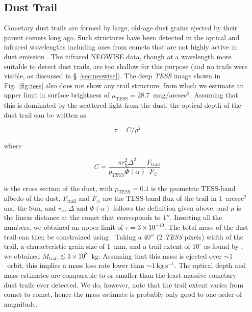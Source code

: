 \documentclass[modern]{aastex631}
\begin{document}
\begin{CJK*}{UTF8}{gbsn}
\subsection{Dust Trail}

Cometary dust trails are formed by large, old-age dust grains ejected by their parent comets long ago. Such structures have been detected in the optical and infrared wavelengths \citep{Sykes1992, Ishiguro2009} including ones from comets that are not highly active in dust emission \citep[e.g., 46P/Wirtanen;][]{Farnham2019}. The infrared NEOWISE data, though at a wavelength more suitable to detect dust trails, are too shallow for this purpose (and no trails were visible, as discussed in \S~\ref{sec:neowise}). The deep {\it TESS} image shown in Fig.~\ref{fig:tess} also does not show any trail structure, from which we estimate an upper limit in surface brightness of $\mu_\mathrm{TESS}=$28.7~mag/arcsec$^2$. Assuming that this is dominated by the scattered light from the dust, the optical depth of the dust trail can be written as

\begin{equation}
    \tau = C/\rho^2
\end{equation}

\noindent where

\begin{equation}
    C=\frac{\pi r_\mathrm{h}^2 \varDelta^2}{p_{TESS} \Phi(\alpha)} \frac{F_\mathrm{trail}}{F_\odot}
\end{equation}

\noindent is the cross section of the dust, with $p_\mathrm{TESS}=0.1$ is the geometric $\mathrm{TESS}$-band albedo of the dust, $F_\mathrm{trail}$ and $F_\odot$ are the $\mathrm{TESS}$-band flux of the trail in 1~arcsec$^2$ and the Sun, and $r_\mathrm{h}$, $\varDelta$ and $\Phi(\alpha)$ follows the definition given above; and $\rho$ is the linear distance at the comet that corresponds to $1''$. Inserting all the numbers, we obtained an upper limit of $\tau=3\times10^{-10}$. The total mass of the dust trail can then be constrained using \citet[][Equation~9]{Reach2007}. Taking a $40''$ (2 {\it TESS} pixels) width of the trail, a characteristic grain size of 1~mm, and a trail extent of $10^\circ$ as found by \citep[][Table~IV]{Sykes1992}, we obtained $M_\mathrm{trail} \lesssim 3\times10^{8}$~kg. Assuming that this mass is ejected over $\sim1$~orbit, this implies a mass loss rate lower than $\sim1~\mathrm{kg~s^{-1}}$. The optical depth and mass estimates are comparable to or smaller than the least massive cometary dust trails ever detected. We do, however, note that the trail extent varies from comet to comet, hence the mass estimate is probably only good to one order of magnitude.


\end{CJK*}
\end{document}
